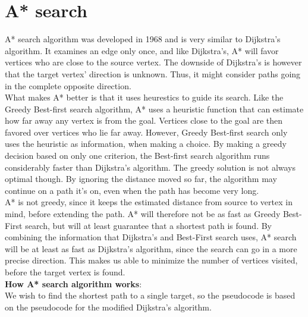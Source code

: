 \documentclass[11pt]{article}
\begin{document}
\section{A* search}
A* search algorithm was developed in 1968 and is very similar to Dijkstra's algorithm. It examines an edge only once, and like Dijkstra's, A* will favor vertices who are close to the source vertex. The downside of Dijkstra's is however that the target vertex' direction is unknown. Thus, it might consider paths going in the complete opposite direction.\\
What makes A* better is that it uses heurestics to guide its search. Like the Greedy Best-first search algorithm, A* uses a heuristic function that can estimate how far away any vertex is from the goal. Vertices close to the goal are then favored over vertices who lie far away. However, Greedy Best-first search only uses the heuristic as information, when making a choice. By making a greedy decision based on only one criterion, the Best-first search algorithm runs considerably faster than Dijkstra's algorithm. The greedy solution is not always optimal though. By ignoring the distance moved so far, the algorithm may continue on a path it's on, even when the path has become very long.\\
A* is not greedy, since it keeps the estimated distance from source to vertex in mind, before extending the path. A* will therefore not be as fast as Greedy Best-First search, but will at least guarantee that a shortest path is found. By combining the information that Dijkstra's and Best-First search uses, A* search will be at least as fast as Dijkstra's algorithm, since the search can go in a more precise direction. This makes us able to minimize the number of vertices visited, before the target vertex is found. \\


\noindent\textbf{How A* search algorithm works}:\\
We wish to find the shortest path to a single target, so the pseudocode is based on the pseudocode for the modified Dijkstra's algorithm.\\
\end{document}
